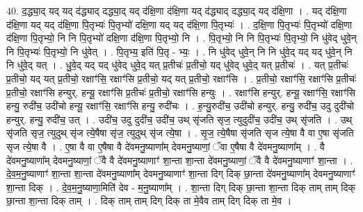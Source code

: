 \documentclass[17pt]{extarticle}
\begin{document}
40. द॒द्ध्या॒द् यद् यद् द॑द्ध्याद् दद्ध्या॒द् यद् द॑क्षि॒णा द॑क्षि॒णा यद् द॑द्ध्याद् दद्ध्या॒द् यद् द॑क्षि॒णा । . यद् द॑क्षि॒णा द॑क्षि॒णा यद् यद् द॑क्षि॒णा पि॒तृभ्यः॑ पि॒तृभ्यो॑ दक्षि॒णा यद् यद् द॑क्षि॒णा पि॒तृभ्यः॑ । . द॒क्षि॒णा पि॒तृभ्यः॑ पि॒तृभ्यो॑ दक्षि॒णा द॑क्षि॒णा पि॒तृभ्यो॒ नि नि पि॒तृभ्यो॑ दक्षि॒णा द॑क्षि॒णा पि॒तृभ्यो॒ नि । . पि॒तृभ्यो॒ नि नि पि॒तृभ्यः॑ पि॒तृभ्यो॒ नि धु॑वेद् धुवे॒न् नि पि॒तृभ्यः॑ पि॒तृभ्यो॒ नि धु॑वेत् । . पि॒तृभ्य॒ इति॑ पि॒तृ - भ्यः॒ । . नि धु॑वेद् धुवे॒न् नि नि धु॑वे॒द् यद् यद् धु॑वे॒न् नि नि धु॑वे॒द् यत् । . धु॒वे॒द् यद् यद् धु॑वेद् धुवे॒द् यत् प्र॒तीचः॑ प्र॒तीचो॒ यद् धु॑वेद् धुवे॒द् यत् प्र॒तीचः॑ । . यत् प्र॒तीचः॑ प्र॒तीचो॒ यद् यत् प्र॒तीचो॒ रक्षाꣳ॑सि॒ रक्षाꣳ॑सि प्र॒तीचो॒ यद् यत् प्र॒तीचो॒ रक्षाꣳ॑सि । . प्र॒तीचो॒ रक्षाꣳ॑सि॒ रक्षाꣳ॑सि प्र॒तीचः॑ प्र॒तीचो॒ रक्षाꣳ॑सि हन्युर्. हन्यू॒ रक्षाꣳ॑सि प्र॒तीचः॑ प्र॒तीचो॒ रक्षाꣳ॑सि हन्युः । . रक्षाꣳ॑सि हन्युर्. हन्यू॒ रक्षाꣳ॑सि॒ रक्षाꣳ॑सि हन्यु॒ रुदी॑च॒ उदी॑चो हन्यू॒ रक्षाꣳ॑सि॒ रक्षाꣳ॑सि हन्यु॒ रुदी॑चः । . ह॒न्यु॒रुदी॑च॒ उदी॑चो हन्युर्. हन्यु॒ रुदी॑च॒ उदु दुदी॑चो हन्युर्. हन्यु॒ रुदी॑च॒ उत् । . उदी॑च॒ उदु दुदी॑च॒ उदी॑च॒ उथ् सृ॑जति सृज॒ त्युदुदी॑च॒ उदी॑च॒ उथ् सृ॑जति । . उथ् सृ॑जति सृज॒ त्युदुथ् सृ॑ज त्ये॒षैषा सृ॑ज॒ त्युदुथ् सृ॑ज त्ये॒षा । . सृ॒ज॒ त्ये॒षैषा सृ॑जति सृज त्ये॒षा वै वा ए॒षा सृ॑जति सृज त्ये॒षा वै । . ए॒षा वै वा ए॒षैषा वै दे॑वमनु॒ष्याणा᳚म् देवमनु॒ष्याणां॒ ॅवा ए॒षैषा वै दे॑वमनु॒ष्याणा᳚म् । . वै दे॑वमनु॒ष्याणा᳚म् देवमनु॒ष्याणां॒ ॅवै वै दे॑वमनु॒ष्याणाꣳ॑ शा॒न्ता शा॒न्ता दे॑वमनु॒ष्याणां॒ ॅवै वै दे॑वमनु॒ष्याणाꣳ॑ शा॒न्ता । . दे॒व॒म॒नु॒ष्याणाꣳ॑ शा॒न्ता शा॒न्ता दे॑वमनु॒ष्याणा᳚म् देवमनु॒ष्याणाꣳ॑ शा॒न्ता दिग् दिक् छा॒न्ता दे॑वमनु॒ष्याणा᳚म् देवमनु॒ष्याणाꣳ॑ शा॒न्ता दिक् । . दे॒व॒म॒नु॒ष्याणा॒मिति॑ देव - म॒नु॒ष्याणा᳚म् । . शा॒न्ता दिग् दिक् छा॒न्ता शा॒न्ता दिक् ताम् ताम् दिक् छा॒न्ता शा॒न्ता दिक् ताम् । . दिक् ताम् ताम् दिग् दिक् ता मे॒वैव ताम् दिग् दिक् ता मे॒व । \newline
\pagebreak
{}
\end{document}
